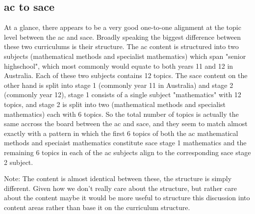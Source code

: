 \documentclass[twoside,12pt,a4paper]{report}
\begin{document}
\subsection{\gls{ac} to \gls{sace}}

At a glance, there appears to be a very good one-to-one alignment at the topic level between the \gls{ac} and \gls{sace}. Broadly speaking the biggest difference between these two curriculums is their structure. The \gls{ac} content is structured into two subjects (mathematical methods and specialist mathematics) which span "senior highschool", which most commonly would equate to both years 11 and 12 in Australia. Each of these two subjects contains 12 topics. The \gls{sace} content on the other hand is split into stage 1 (commonly year 11 in Australia) and stage 2 (commonly year 12), stage 1 consists of a single subject "mathematics" with 12 topics, and stage 2 is split into two (mathematical methods and specialist mathematics) each with 6 topics. So the total number of topics is actually the same accross the board between the \gls{ac} and \gls{sace}, and they seem to match almost exactly with a pattern in which the first 6 topics of both the \gls{ac} mathematical methods and speciaist mathematics constitute \gls{sace} stage 1 mathematics and the remaining 6 topics in each of the \gls{ac} subjects align to the corresponding \gls{sace} stage 2 subject.

Note: The content is almost identical between these, the structure is simply different. Given how we don't really care about the structure, but rather care about the content maybe it would be more useful to structure this discussion into content areas rather than base it on the curriculum structure.
\end{document}
